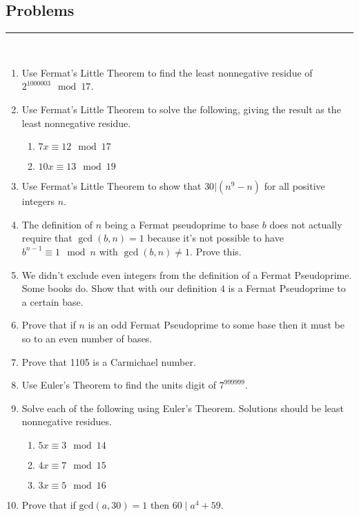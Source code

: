 \documentclass[class=article, crop=false]{standalone}
\begin{document}
\subsection{Problems}
\rule{\textwidth}{1pt}\\
\begin{enumerate}
\item
  Use Fermat's Little Theorem
  to find the least nonnegative residue of
  $2^{1000003}\mod 17$.

\item
  Use Fermat's Little Theorem to solve the following,
  giving the result as the least nonnegative residue.
  \begin{enumerate}
  \item
	$7x\equiv 12\mod 17$
  \item
	$10x\equiv 13\mod 19$
\end{enumerate}

\item
  Use Fermat's Little Theorem
  to show that
  $30\big|(n^9-n)$
  for all positive integers $n$.

\item
  The definition of $n$ being a Fermat pseudoprime to base $b$
  does not actually require that $\gcd(b,n)=1$
  because it's not possible to have $b^{n-1}\equiv 1\mod n$ with $\gcd(b,n)\neq 1$.
  Prove this.

\item
  We didn't exclude even integers from the definition of a Fermat Pseudoprime.
  Some books do.
  Show that with our definition
  $4$ is a Fermat Pseudoprime to a certain base.

\item
  Prove that if $n$ is an odd Fermat Pseudoprime to some base
  then it must be so to an even number of bases.

\item
  Prove that 1105 is a Carmichael number.

\item
  Use Euler's Theorem to find the units digit of $7^{999999}$.

\item
  Solve each of the following using Euler's Theorem.
  Solutions should be least nonnegative residues.
\begin{enumerate}
\item
  $5x\equiv 3\mod 14$
\item
  $4x\equiv 7\mod 15$
\item
  $3x\equiv 5\mod 16$
\end{enumerate}

\item
  Prove that if $\text{gcd}(a,30)=1$ then $60\mid a^4+59$.


\end{enumerate}
\end{document}
